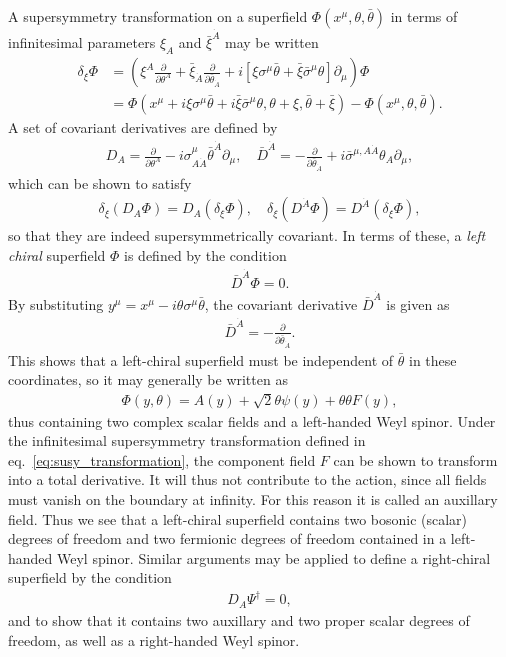 \documentclass[twoside,english]{uiofysmaster}
\begin{document}
A supersymmetry transformation on a superfield $\Phi(x^\mu, \theta, \bar\theta)$ in terms of infinitesimal parameters $\xi_A$ and $\bar\xi^{\dot A}$ may be written
\begin{align}
	\delta_\xi \Phi &= \left( \xi^A \frac{\partial}{\partial \theta^A} + \bar\xi_{\dot A}\frac{\partial}{\partial \bar\theta_{\dot A}} + i\left[ \xi\sigma^\mu \bar\theta + \bar\xi \bar\sigma^\mu \theta  \right]\partial_\mu \right)\Phi\label{eq:susy_transformation}\\
	&= \Phi(x^\mu + i\xi\sigma^\mu\bar\theta + i\bar\xi \bar\sigma^\mu \theta, \theta + \xi, \bar\theta + \bar\xi) - \Phi(x^\mu, \theta, \bar\theta).\nonumber
\end{align}
A set of covariant derivatives are defined by
\begin{align}
	D_A = \frac{\partial}{\partial \theta^A} - i\sigma^\mu_{A \dot A}\bar\theta^{\dot A}\partial_\mu, \quad \bar D^{\dot A} = -\frac{\partial}{\partial \bar \theta_{\dot A}} + i\bar\sigma^{\mu,A \dot A}\theta_A \partial_\mu,
\end{align}
which can be shown to satisfy
\begin{align}
 	\delta_\xi (D_A \Phi) = D_A ( \delta_\xi \Phi), \quad \delta_\xi (D^{\dot A} \Phi ) = D^{\dot A} ( \delta_\xi \Phi),
 \end{align}
 so that they are indeed supersymmetrically covariant. In terms of these, a {\it left chiral} superfield $\Phi$ is defined by the condition
\begin{align}
	\bar D^{\dot A} \Phi = 0.
\end{align}
By substituting $y^\mu = x^\mu - i\theta\sigma^\mu \bar \theta$, the covariant derivative $\bar D^{\dot A}$ is given as
\begin{align}
	\bar D^{\dot A} = -\frac{\partial}{\partial \bar\theta_{\dot A}}.
\end{align}
This shows that a left-chiral superfield must be independent of $\bar \theta$ in these coordinates, so it may generally be written as
\begin{align}
	\Phi(y, \theta) = A(y) + \sqrt{2}\theta\psi(y) + \theta\theta F(y), 
\end{align}
thus containing two complex scalar fields and a left-handed Weyl spinor. Under the infinitesimal supersymmetry transformation defined in eq.\ \eqref{eq:susy_transformation}, the component field $F$ can be shown to transform into a total derivative. It will thus not contribute to the action, since all fields must vanish on the boundary at infinity. For this reason it is called an auxillary field. Thus we see that a left-chiral superfield contains two bosonic (scalar) degrees of freedom and two fermionic degrees of freedom contained in a left-handed Weyl spinor. Similar arguments may be applied to define a right-chiral superfield by the condition
\begin{align}
	D_A \Psi^\dag = 0,
\end{align}
and to show that it contains two auxillary and two proper scalar degrees of freedom, as well as a right-handed Weyl spinor. 
\end{document}
